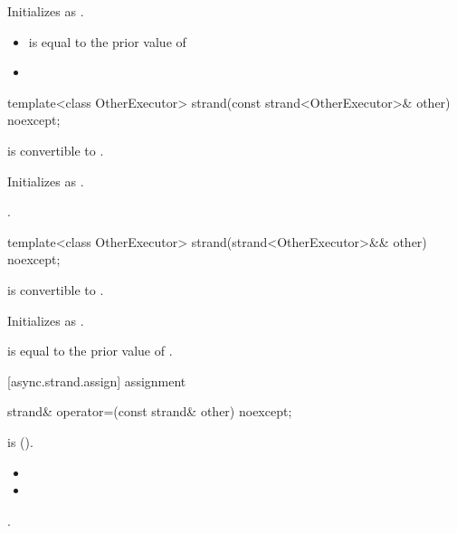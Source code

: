 \begin{itemdescr}
\pnum
\effects Initializes  as .

\pnum
\postconditions
\begin{itemize}
\item
{} is equal to the prior value of 
\item
{}
\end{itemize}
\end{itemdescr}

\begin{itemdecl}
template<class OtherExecutor> strand(const strand<OtherExecutor>& other) noexcept;
\end{itemdecl}

\begin{itemdescr}
\pnum
\requires {} is convertible to .

\pnum
\effects Initializes  as .

\pnum
\postconditions {}.
\end{itemdescr}

\begin{itemdecl}
template<class OtherExecutor> strand(strand<OtherExecutor>&& other) noexcept;
\end{itemdecl}

\begin{itemdescr}
\pnum
\requires {} is convertible to .

\pnum
\effects Initializes  as .

\pnum
\postconditions {} is equal to the prior value of .
\end{itemdescr}



[async.strand.assign]{ assignment}

%
\begin{itemdecl}
strand& operator=(const strand& other) noexcept;
\end{itemdecl}

\begin{itemdescr}
\pnum
\requires {} is  ().

\pnum
\postconditions
\begin{itemize}
\item
{}
\item
{}
\end{itemize}

\pnum
\returns {}.
\end{itemdescr}

